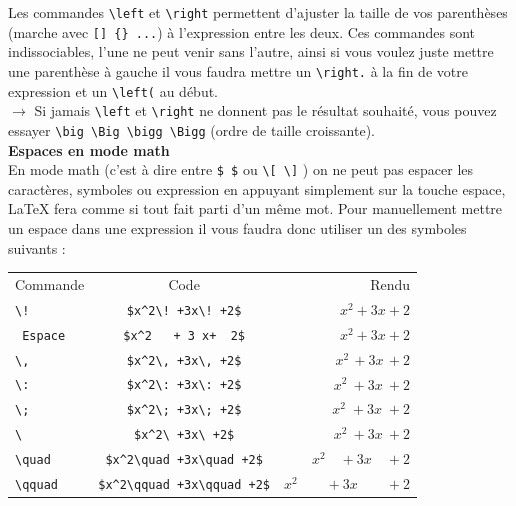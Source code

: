 \documentclass[11pt]{article}				%
\begin{document}
Les commandes \verb|\left| et \verb|\right| permettent d'ajuster la taille de vos parenthèses (marche avec \verb|[] {} ...|) à l'expression entre les deux. Ces commandes sont indissociables, l'une ne peut venir sans l'autre, ainsi si vous voulez juste mettre une parenthèse à gauche il vous faudra mettre un \verb|\right.| à la fin de votre expression et un \verb|\left(| au début.\\

$\rightarrow$ Si jamais \verb|\left| et \verb|\right| ne donnent pas le résultat souhaité, vous pouvez essayer \verb|\big \Big \bigg \Bigg| (ordre de taille croissante).\\


\textbf{Espaces en mode math}\\

En mode math (c'est à dire entre \verb|$ $| ou \verb|\[ \]| ) on ne peut pas espacer les caractères, symboles ou expression en appuyant simplement sur la touche espace, LaTeX fera comme si tout fait parti d'un même mot. Pour manuellement mettre un espace dans une expression il vous faudra donc utiliser un des symboles suivants :\\

\begin{center}
	\begin{tabular}{lcr}
	
	Commande & Code   &  Rendu \\ 
	
	\verb|\!|  & \verb|$x^2\! +3x\! +2$| & $ x^2\! +3x\! +2$   \\ 
	 
	\verb| Espace |&\verb|$x^2   + 3 x+  2$|  & $x^2+3x+2$ \\ 
	 
	 \verb|\,| & \verb|$x^2\, +3x\, +2$| & $x^2\, +3x\, +2$ \\ 
	 
	 \verb|\:|& \verb|$x^2\: +3x\: +2$| & $x^2\: +3x\: +2$ \\ 
	 
	 \verb|\;|& \verb|$x^2\; +3x\; +2$| & $x^2\; +3x\; +2$ \\ 
	 
	 \verb|\ | & \verb|$x^2\ +3x\ +2$| &  $x^2\ +3x\ +2$ \\ 
	 
	\verb|\quad | & \verb|$x^2\quad +3x\quad +2$| & $x^2\quad +3x\quad +2$  \\ 
	 
	 \verb|\qquad | & \verb|$x^2\qquad +3x\qquad +2$| & $x^2\qquad +3x\qquad +2$  \\ 
\end{tabular}
\end{center} 
\end{document}
